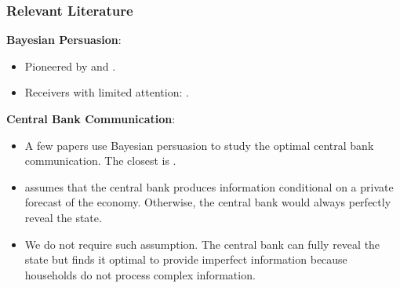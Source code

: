 \documentclass{beamer}
\begin{document}
\begin{frame}
\frametitle{Relevant Literature}
\textbf{Bayesian Persuasion}:
\begin{itemize}
    \item Pioneered by \cite{aumann1995repeated} and \cite{KG2011}. 
    \item Receivers with limited attention: \cite{Bloedel2020,Lipnowski2020,lipnowski2022,Wei2021,Matyskova2021,innocenti2022can}.
\end{itemize}
\vskip10pt
\textbf{Central Bank Communication}:
\begin{itemize}
    \item A few papers use Bayesian persuasion to study the optimal central bank communication. The closest is \cite{Ko2022}.
    \item \cite{Ko2022} assumes that the central bank produces information conditional on a private forecast of the economy. Otherwise, the central bank would always perfectly reveal the state. 
    \item We do not require such assumption. The central bank can fully reveal the state but finds it optimal to provide imperfect information because households do not process complex information.
\end{itemize}
\end{frame}
\end{document}

